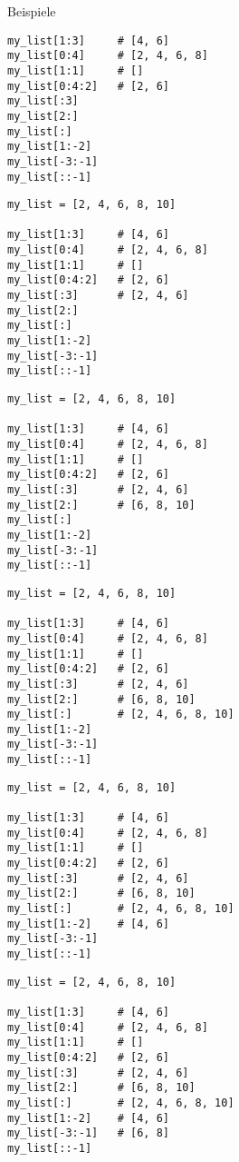 \begin{fragile}
\begin{exampleblock}{Beispiele}
\begin{overprint}
\begin{verbatim}
my_list[1:3]     # [4, 6]
my_list[0:4]     # [2, 4, 6, 8]
my_list[1:1]     # []
my_list[0:4:2]   # [2, 6]
my_list[:3]      
my_list[2:]      
my_list[:]       
my_list[1:-2]    
my_list[-3:-1]   
my_list[::-1]    
\end{verbatim}

\begin{verbatim}
my_list = [2, 4, 6, 8, 10]

my_list[1:3]     # [4, 6]
my_list[0:4]     # [2, 4, 6, 8]
my_list[1:1]     # []
my_list[0:4:2]   # [2, 6]
my_list[:3]      # [2, 4, 6]
my_list[2:]      
my_list[:]       
my_list[1:-2]   
my_list[-3:-1]   
my_list[::-1]    
\end{verbatim}

\begin{verbatim}
my_list = [2, 4, 6, 8, 10]

my_list[1:3]     # [4, 6]
my_list[0:4]     # [2, 4, 6, 8]
my_list[1:1]     # []
my_list[0:4:2]   # [2, 6]
my_list[:3]      # [2, 4, 6]
my_list[2:]      # [6, 8, 10]
my_list[:]       
my_list[1:-2]    
my_list[-3:-1]  
my_list[::-1]    
\end{verbatim}

\begin{verbatim}
my_list = [2, 4, 6, 8, 10]

my_list[1:3]     # [4, 6]
my_list[0:4]     # [2, 4, 6, 8]
my_list[1:1]     # []
my_list[0:4:2]   # [2, 6]
my_list[:3]      # [2, 4, 6]
my_list[2:]      # [6, 8, 10]
my_list[:]       # [2, 4, 6, 8, 10]
my_list[1:-2]    
my_list[-3:-1]   
my_list[::-1]    
\end{verbatim}

\begin{verbatim}
my_list = [2, 4, 6, 8, 10]

my_list[1:3]     # [4, 6]
my_list[0:4]     # [2, 4, 6, 8]
my_list[1:1]     # []
my_list[0:4:2]   # [2, 6]
my_list[:3]      # [2, 4, 6]
my_list[2:]      # [6, 8, 10]
my_list[:]       # [2, 4, 6, 8, 10]
my_list[1:-2]    # [4, 6]
my_list[-3:-1]    
my_list[::-1]     
\end{verbatim}

\begin{verbatim}
my_list = [2, 4, 6, 8, 10]

my_list[1:3]     # [4, 6]
my_list[0:4]     # [2, 4, 6, 8]
my_list[1:1]     # []
my_list[0:4:2]   # [2, 6]
my_list[:3]      # [2, 4, 6]
my_list[2:]      # [6, 8, 10]
my_list[:]       # [2, 4, 6, 8, 10]
my_list[1:-2]    # [4, 6]
my_list[-3:-1]   # [6, 8] 
my_list[::-1]     
\end{verbatim}


\end{overprint}
\end{exampleblock}
\end{fragile}
